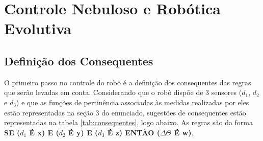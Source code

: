 \section{Controle Nebuloso e Robótica Evolutiva}

\setcounter{subsection}{-1}
\subsection{Definição dos Consequentes }

O primeiro passo no controle do robô é a definição dos consequentes das regras
que serão levadas em conta. Considerando que o robô dispõe de 3 sensores
(\(d_1\), \(d_2\) e \(d_3\)) e que as funções de pertinência associadas às
medidas realizadas por eles estão representadas na seção 3 do enunciado, sugestões de consequentes estão
representadas na tabela \ref{tab:consequentes}, logo abaixo. As regras são da
forma \textbf{SE (\(d_1\) É x) E (\(d_2\) É y) E (\(d_3\) É z) ENTÃO
(\(\Delta \Theta\) É w)}.

